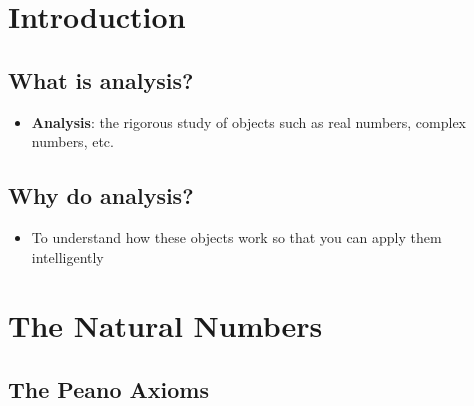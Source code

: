\documentclass[12pt]{article}
\begin{document}
\section{Introduction}

\subsection{What is analysis?}

\begin{itemize}
  \item \textbf{Analysis}: the rigorous study of objects such as real numbers, complex numbers, etc.
\end{itemize}

\subsection{Why do analysis?}

\begin{itemize}
  \item To understand how these objects work so that you can apply them intelligently
\end{itemize}

\section{The Natural Numbers}

\subsection{The Peano Axioms}
\end{document}
